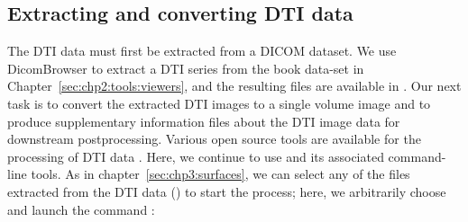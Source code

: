 \subsection{Extracting and converting DTI data}
\label{sec:chp-dti:extract-and-convert}
The DTI data must first be extracted from a DICOM dataset. We use
DicomBrowser to extract a DTI series from the book data-set in
Chapter~\ref{sec:chp2:tools:viewers}, and the resulting files are
available in . Our next task is to convert the
extracted DTI images to a single volume image and to produce
supplementary information files about the DTI image data for
downstream postprocessing.  Various open source tools are available
for the processing of DTI data \cite{soares2013hitchhiker}. Here, we
continue to use \freesurfer{} and its associated command-line tools. 
As in chapter~\ref{sec:chp3:surfaces}, we can select any of the files 
extracted from the  DTI data () to start 
the process; here, we arbitrarily choose  and launch the 
{\freesurfer} command :

